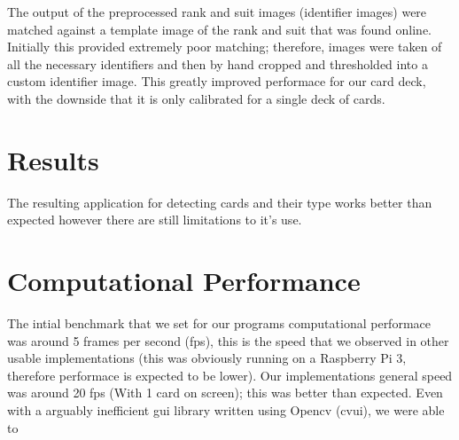 \documentclass[conference]{IEEEtran}
\begin{document}

The output of the preprocessed rank and suit images (identifier images) were matched against a
template image of the rank and suit that was found online. Initially this provided extremely poor
matching; therefore, images were taken of all the necessary identifiers and then by hand cropped and
thresholded into a custom identifier image. This greatly improved performace for our card deck, with
the downside that it is only calibrated for a single deck of cards.

\section{Results}
The resulting application for detecting cards and their type works better than expected however
there are still limitations to it's use.

\section{Computational Performance}
The intial benchmark that we set for our programs computational performace was around 5 frames per
second (fps), this is the speed that we observed in other usable implementations
\cite{opencv-card-detection} (this was obviously running on a Raspberry Pi 3, therefore performace
is expected to be lower). Our implementations general speed was around 20 fps (With 1 card on
screen); this was better than expected. Even with a arguably inefficient gui library written using
Opencv (cvui), we were able to 
\end{document}
